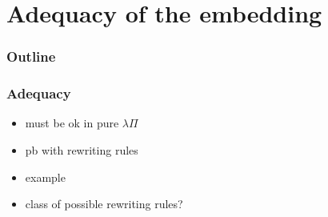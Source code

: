 \section{Adequacy of the embedding}

\begin{frame}
\frametitle{Outline}

\tableofcontents[currentsection]
\end{frame}


\begin{frame}
\frametitle{Adequacy}

\begin{itemize}
\item must be ok in pure $\lambda\Pi$
\item pb with rewriting rules
\item example
\item class of possible rewriting rules?
\end{itemize}

\end{frame}
